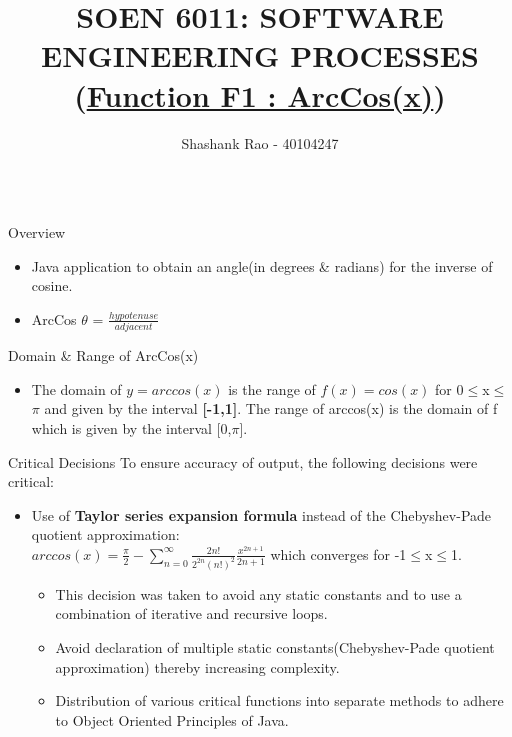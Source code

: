 \documentclass{beamer}
\author[https://github.com/ShashankRao17/SOEN6011-Software-Engineering-Processes]{Shashank Rao - 40104247}
\title{\LARGE SOEN 6011: SOFTWARE ENGINEERING PROCESSES\\(\underline{Function F1 : ArcCos(x)})}
\institute{Concordia University - DEPARTMENT OF COMPUTER SCIENCE AND SOFTWARE ENGINEERING }
\begin{document}
\begin{frame}[fragile]
\begin{columns}[T]

\begin{column}{.27\textwidth}

\begin{block}{Overview}
\begin{itemize}
\item Java application to obtain an angle(in degrees \& radians) for the inverse of cosine.
\item \large ArcCos $\theta$ = \Large$\frac{hypotenuse}{adjacent}$
\end{itemize}
\end{block}



\begin{block}{Domain \& Range of ArcCos(x)}
\begin{itemize}
\item The domain of $y=arccos(x)$ is the range of $f(x)=cos(x)$ for 0$\leq$x$\leq$$\pi$ and given by the interval \textbf{[-1,1]}. The range of arccos(x) is the domain of f which is given by the interval [0,$\pi$].

\end{itemize}
\end{block}

\begin{block}{Critical Decisions}
To ensure accuracy of output, the following decisions were critical:
\begin{itemize}
\item Use of \textbf{Taylor series expansion formula} instead of the Chebyshev-Pade quotient approximation:\\
$arccos(x)=\frac{\pi}{2}-\sum_{n=0}^{\infty}\frac{2n!}{2^{2n}(n!)^2}\frac{x^{2n+1}}{2n+1}$ which converges for -1$\leq$x$\leq$1.
    \begin{itemize}
        \item This decision was taken to avoid any static constants and to use a combination of iterative and recursive loops.
        \item Avoid declaration of multiple static constants(Chebyshev-Pade quotient approximation) thereby increasing complexity.
        \item Distribution of various critical functions into separate methods to adhere to Object Oriented Principles of Java.
    \end{itemize}


\end{itemize}
\end{block}
\end{column}
\end{columns}
\end{frame}
\end{document}
